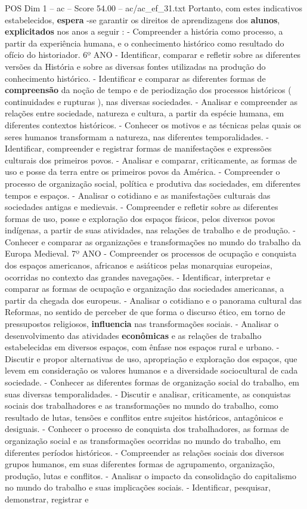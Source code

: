 \begin{textsample}{POS Dim 1 – ac – Score 54.00 – ac/ac\_ef\_31.txt}
Portanto, com estes indicativos estabelecidos, \textbf{espera} -se garantir os direitos de aprendizagens dos \textbf{alunos}, \textbf{explicitados} nos anos a seguir : - Compreender a história como processo, a partir da experiência humana, e o conhecimento histórico como resultado do ofício do historiador. 6º ANO - Identificar, comparar e refletir sobre as diferentes versões da História e sobre as diversas fontes utilizadas na produção do conhecimento histórico. - Identificar e comparar as diferentes formas de \textbf{compreensão} da noção de tempo e de periodização dos processos históricos ( continuidades e rupturas ), nas diversas sociedades. - Analisar e compreender as relações entre sociedade, natureza e cultura, a partir da espécie humana, em diferentes contextos históricos. - Conhecer os motivos e as técnicas pelas quais os seres humanos transformam a natureza, nas diferentes temporalidades. - Identificar, compreender e registrar formas de manifestações e expressões culturais dos primeiros povos. - Analisar e comparar, criticamente, as formas de uso e posse da terra entre os primeiros povos da América. - Compreender o processo de organização social, política e produtiva das sociedades, em diferentes tempos e espaços. - Analisar o cotidiano e as manifestações culturais das sociedades antigas e medievais. - Compreender e refletir sobre as diferentes formas de uso, posse e exploração dos espaços físicos, pelos diversos povos indígenas, a partir de suas atividades, nas relações de trabalho e de produção. - Conhecer e comparar as organizações e transformações no mundo do trabalho da Europa Medieval. 7º ANO - Compreender os processos de ocupação e conquista dos espaços americanos, africanos e asiáticos pelas monarquias europeias, ocorridas no contexto das grandes navegações. - Identificar, interpretar e comparar as formas de ocupação e organização das sociedades americanas, a partir da chegada dos europeus. - Analisar o cotidiano e o panorama cultural das Reformas, no sentido de perceber de que forma o discurso ético, em torno de pressupostos religiosos, \textbf{influencia} nas transformações sociais. - Analisar o desenvolvimento das atividades \textbf{econômicas} e as relações de trabalho estabelecidas em diversos espaços, com ênfase nos espaços rural e urbano. - Discutir e propor alternativas de uso, apropriação e exploração dos espaços, que levem em consideração os valores humanos e a diversidade sociocultural de cada sociedade. - Conhecer as diferentes formas de organização social do trabalho, em suas diversas temporalidades. - Discutir e analisar, criticamente, as conquistas sociais dos trabalhadores e as transformações no mundo do trabalho, como resultado de lutas, tensões e conflitos entre sujeitos históricos, antagônicos e desiguais. - Conhecer o processo de conquista dos trabalhadores, as formas de organização social e as transformações ocorridas no mundo do trabalho, em diferentes períodos históricos. - Compreender as relações sociais dos diversos grupos humanos, em suas diferentes formas de agrupamento, organização, produção, lutas e conflitos. - Analisar o impacto da consolidação do capitalismo no mundo do trabalho e suas implicações sociais. - Identificar, pesquisar, demonstrar, registrar e 
\end{textsample}
